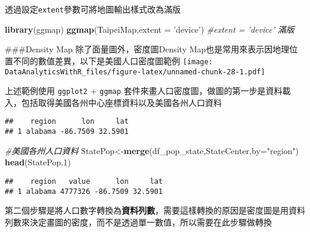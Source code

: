 \documentclass[
]{book}
\newenvironment{Shaded}{\begin{snugshade}}{\end{snugshade}}
\newcommand{\CommentTok}[1]{\textcolor[rgb]{0.56,0.35,0.01}{\textit{#1}}}
\newcommand{\DataTypeTok}[1]{\textcolor[rgb]{0.13,0.29,0.53}{#1}}
\newcommand{\DecValTok}[1]{\textcolor[rgb]{0.00,0.00,0.81}{#1}}
\newcommand{\KeywordTok}[1]{\textcolor[rgb]{0.13,0.29,0.53}{\textbf{#1}}}
\newcommand{\NormalTok}[1]{#1}
\newcommand{\OperatorTok}[1]{\textcolor[rgb]{0.81,0.36,0.00}{\textbf{#1}}}
\newcommand{\StringTok}[1]{\textcolor[rgb]{0.31,0.60,0.02}{#1}}
\begin{document}
透過設定\texttt{extent}參數可將地圖輸出樣式改為滿版

\begin{Shaded}
\begin{Highlighting}[]
\KeywordTok{library}\NormalTok{(ggmap)}
\KeywordTok{ggmap}\NormalTok{(TaipeiMap,}\DataTypeTok{extent =} \StringTok{'device'}\NormalTok{) }\CommentTok{#extent = 'device' 滿版}
\end{Highlighting}
\end{Shaded}

\#\#\#Density Map
除了面量圖外，密度圖Density Map也是常用來表示因地理位置不同的數值差異，以下是美國人口密度圖範例
\texttt{[image: DataAnalyticsWithR\_files/figure-latex/unnamed-chunk-28-1.pdf]}

上述範例使用 \texttt{ggplot2} + \texttt{ggmap} 套件來畫人口密度圖，做圖的第一步是資料載入，包括取得美國各州中心座標資料以及美國各州人口資料

\begin{Shaded}
\end{Shaded}

\begin{verbatim}
##    region      lon     lat
## 1 alabama -86.7509 32.5901
\end{verbatim}

\begin{Shaded}
\begin{Highlighting}[]
\CommentTok{#美國各州人口資料}
\NormalTok{StatePop<-}\KeywordTok{merge}\NormalTok{(df_pop_state,StateCenter,}\DataTypeTok{by=}\StringTok{"region"}\NormalTok{) }
\KeywordTok{head}\NormalTok{(StatePop,}\DecValTok{1}\NormalTok{)}
\end{Highlighting}
\end{Shaded}

\begin{verbatim}
##    region   value      lon     lat
## 1 alabama 4777326 -86.7509 32.5901
\end{verbatim}

第二個步驟是將人口數字轉換為\textbf{資料列數}，需要這樣轉換的原因是密度圖是用資料列數來決定畫圖的密度，而不是透過單一數值，所以需要在此步驟做轉換
\end{document}
